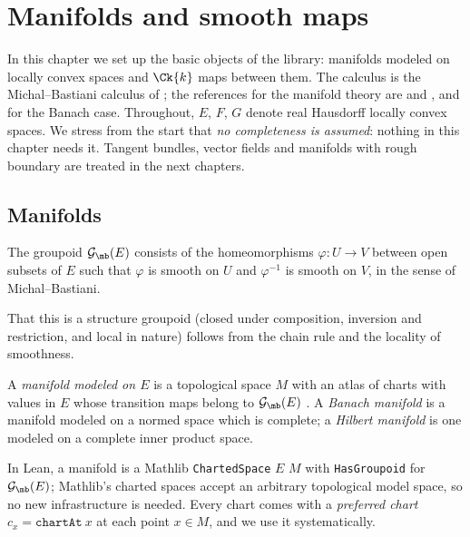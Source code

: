 \chapter{Manifolds and smooth maps}
\label{chap:manifolds}

In this chapter we set up the basic objects of the library: manifolds modeled on locally convex
spaces and $\Ck{k}$ maps between them. The calculus is the Michal--Bastiani calculus of
\cite{LCA}; the references for the manifold theory are \cite[\S I.3]{Nee06} and
\cite[Ch.~3]{GN26}, and \cite{Lan99} for the Banach case. Throughout, $E$, $F$, $G$ denote real
Hausdorff locally convex spaces. We stress from the start that \emph{no completeness is assumed}:
nothing in this chapter needs it. Tangent bundles, vector fields and manifolds with rough boundary
are treated in the next chapters.

\section{Manifolds}

\begin{definition}
  \label{def:mb-groupoid}
  \leanok
  The groupoid $\mathcal{G}_{\mb}(E)$ consists of the homeomorphisms $\varphi\colon U \to V$
  between open subsets of $E$ such that $\varphi$ is smooth on $U$ and $\varphi^{-1}$ is smooth
  on $V$, in the sense of Michal--Bastiani.
\end{definition}

That this is a structure groupoid (closed under composition, inversion and restriction, and
local in nature) follows from the chain rule and the locality of smoothness.

\begin{definition}[Manifolds]
  \label{def:mb-manifold}
  \leanok
  A \emph{manifold modeled on $E$} is a topological space $M$ with an atlas of charts with
  values in $E$ whose transition maps belong to $\mathcal{G}_{\mb}(E)$
  \cite[Definition I.3.1]{Nee06}. A \emph{Banach manifold} is a manifold modeled on a normed
  space which is complete; a \emph{Hilbert manifold} is one modeled on a complete inner product
  space.
\end{definition}

In Lean, a manifold is a Mathlib \texttt{ChartedSpace} $E$ $M$ with \texttt{HasGroupoid} for
$\mathcal{G}_{\mb}(E)$; Mathlib's charted spaces accept an arbitrary topological model space, so
no new infrastructure is needed. Every chart comes with a \emph{preferred chart}
$c_x = \texttt{chartAt}\ x$ at each point $x \in M$, and we use it systematically.

